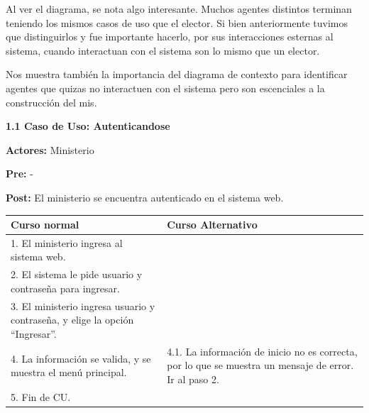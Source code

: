 Al ver el diagrama, se nota algo interesante. Muchos agentes distintos terminan teniendo los mismos casos de uso que el elector. Si bien anteriormente tuvimos que distinguirlos y fue importante hacerlo, por sus interacciones esternas al sistema, cuando interactuan con el sistema son lo mismo que un elector.

Nos muestra también la importancia del diagrama de contexto para identificar agentes que quizas no interactuen con el sistema pero son escenciales a la construcción del mis.

\textbf{1.1 Caso de Uso: Autenticandose}

\textbf{Actores:} Ministerio

\textbf{Pre:} -

\textbf{Post:} El ministerio se encuentra autenticado en el sistema web.
\begin{table}[h!]
	
 \begin{tabular}{|p{7.5cm} | p{7.5cm}|} 
 \hline
 \textbf{Curso normal} & \textbf{Curso Alternativo} \\
 \hline
 1. El ministerio ingresa al sistema web. & \\
 \hline
 
 2. El sistema le pide usuario y contraseña para ingresar. & \\
 \hline 
 3. El ministerio ingresa usuario y contraseña, y elige la opción “Ingresar”. & \\
 \hline 
 4. La información se valida, y se muestra el menú principal. & 
4.1. La información de inicio no es correcta, por lo que se muestra un mensaje de error. Ir al paso 2.
\\
 \hline 
 5. Fin de CU. & \\

 \hline
 \end{tabular}

\end{table}


